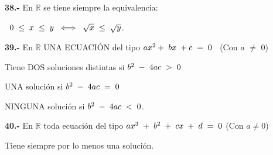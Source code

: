 \documentclass[12pt]{article}
\begin{document}
\textbf{38.-} En $\mathbb{R}$ se tiene siempre la equivalencia: \vspace{0.1cm}

\hspace{4cm}$\hspace{0.2cm} 0\hspace{0.1cm}\leq\hspace{0.1cm}x\hspace{0.1cm}\leq\hspace{0.1cm}y\hspace{0.2cm}\Longleftrightarrow\hspace{0.2cm} \sqrt{x}\hspace{0.1cm}\leq\hspace{0.1cm}\sqrt{y}$.
\vspace{0.2cm}

\textbf{39.-} En $\mathbb{R}$ UNA ECUACIÓN del tipo $ax^{2}+\hspace{0.1cm}bx\hspace{0.1cm}+c\hspace{0.1cm}=\hspace{0.1cm}0 \hspace{0.2cm}$ (Con $a$ $\neq$ $0$) \vspace{0.2cm}

Tiene DOS soluciones distintas si \hspace{0.4cm} $b^{2} \hspace{0.1cm} - \hspace{0.1cm}4ac\hspace{0.1cm} > \hspace{0.1cm}0$ \vspace{0.1cm}

\hspace{1.3cm}UNA solución \hspace{2.3cm}si \hspace{0.4cm} $b^{2} \hspace{0.1cm} - \hspace{0.1cm}4ac\hspace{0.1cm} = \hspace{0.1cm}0$ \vspace{0.1cm}

\hspace{0.6cm}NINGUNA solución \hspace{1.85cm}si \hspace{0.4cm} $b^{2} \hspace{0.1cm} - \hspace{0.1cm}4ac\hspace{0.1cm} < \hspace{0.1cm}0$.
\vspace{0.2cm}

\textbf{40.-} En $\mathbb{R}$ toda ecuación del tipo $ax^{3} \hspace{0.1cm}+\hspace{0.1cm}b^{2}\hspace{0.1cm}+\hspace{0.1cm}cx\hspace{0.1cm}+\hspace{0.1cm}d\hspace{0.1cm}=\hspace{0.1cm}0$ \hspace{0.2cm} (Con $a\neq 0$)\vspace{0.1cm}

Tiene siempre por lo menos una solución. 

 
\end{document}
